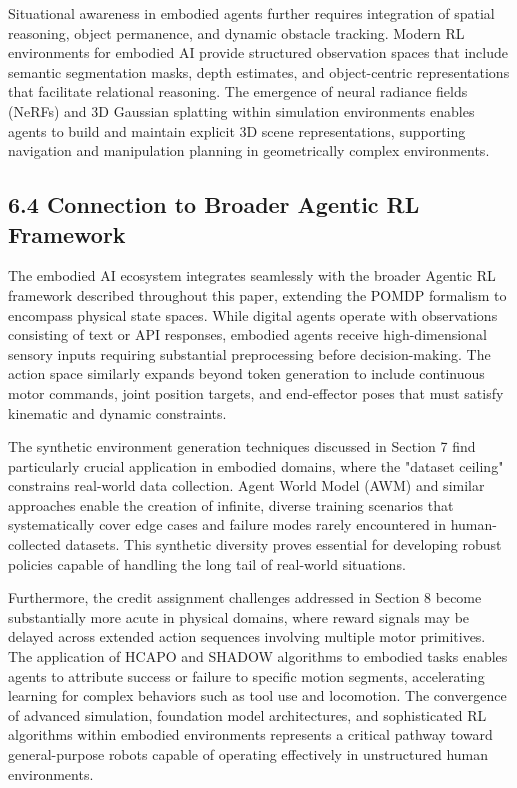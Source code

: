 Situational awareness in embodied agents further requires integration of spatial reasoning, object permanence, and dynamic obstacle tracking. Modern RL environments for embodied AI provide structured observation spaces that include semantic segmentation masks, depth estimates, and object-centric representations that facilitate relational reasoning. The emergence of neural radiance fields (NeRFs) and 3D Gaussian splatting within simulation environments enables agents to build and maintain explicit 3D scene representations, supporting navigation and manipulation planning in geometrically complex environments.

\subsection{6.4 Connection to Broader Agentic RL Framework}

The embodied AI ecosystem integrates seamlessly with the broader Agentic RL framework described throughout this paper, extending the POMDP formalism to encompass physical state spaces. While digital agents operate with observations consisting of text or API responses, embodied agents receive high-dimensional sensory inputs requiring substantial preprocessing before decision-making. The action space similarly expands beyond token generation to include continuous motor commands, joint position targets, and end-effector poses that must satisfy kinematic and dynamic constraints.

The synthetic environment generation techniques discussed in Section 7 find particularly crucial application in embodied domains, where the "dataset ceiling" constrains real-world data collection. Agent World Model (AWM) and similar approaches enable the creation of infinite, diverse training scenarios that systematically cover edge cases and failure modes rarely encountered in human-collected datasets. This synthetic diversity proves essential for developing robust policies capable of handling the long tail of real-world situations.

Furthermore, the credit assignment challenges addressed in Section 8 become substantially more acute in physical domains, where reward signals may be delayed across extended action sequences involving multiple motor primitives. The application of HCAPO and SHADOW algorithms to embodied tasks enables agents to attribute success or failure to specific motion segments, accelerating learning for complex behaviors such as tool use and locomotion. The convergence of advanced simulation, foundation model architectures, and sophisticated RL algorithms within embodied environments represents a critical pathway toward general-purpose robots capable of operating effectively in unstructured human environments.

